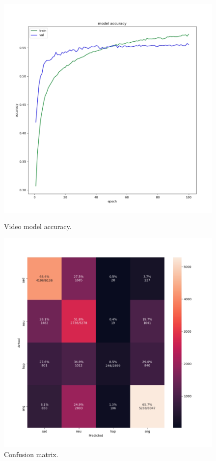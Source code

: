 \documentclass[oneside]{report}
\begin{document}
        \begin{figure}[H]
        \centering
        \begin{minipage}{.5\textwidth}
        \centering
        \includegraphics[scale=0.6]{accuracy.png}
        \caption{Video model accuracy.}
        \label{fig:accuracy}
        \end{minipage}%
        \begin{minipage}{.5\textwidth}
        \centering
        \includegraphics[scale=0.6]{cm.png}
        \caption{Confusion matrix.}
        \label{fig:cm}
        \end{minipage}
        \end{figure}
\end{document}

